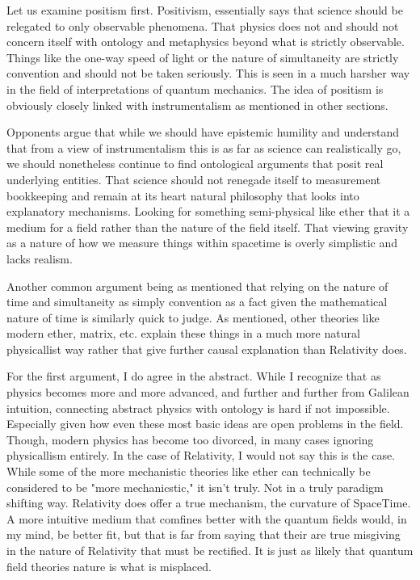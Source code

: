 Let us examine positism first. Positivism, essentially says that science should be relegated to only observable phenomena. That physics does not
and should not concern itself with ontology and metaphysics beyond what is strictly observable. Things like the one-way speed of light or
the nature of simultaneity are strictly convention and should not be taken seriously. This is seen in a much harsher way in the field of interpretations
of quantum mechanics. The idea of positism is obviously closely linked with instrumentalism as mentioned in other sections.

Opponents argue that while we should have epistemic humility and understand that from a view of instrumentalism this is as far as science can realistically
go, we should nonetheless continue to find ontological arguments that posit real underlying entities. That science should not renegade itself to
measurement bookkeeping and remain at its heart natural philosophy that looks into explanatory mechanisms. Looking for something semi-physical like
ether that it a medium for a field rather than the nature of the field itself. That viewing gravity as a nature of how we measure things within
spacetime is overly simplistic and lacks realism.

Another common argument being as mentioned that relying on the nature of time and simultaneity as simply convention as a fact given the mathematical
nature of time is similarly quick to judge. As mentioned, other theories like modern ether, matrix, etc. explain these things in a much more
natural physicallist way rather that give further causal explanation than Relativity does.

For the first argument, I do agree in the abstract. While I recognize that as physics becomes more and more advanced, and further and further from
Galilean intuition, connecting abstract physics with ontology is hard if not impossible. Especially given how even these most basic ideas are
open problems in the field. Though, modern physics has become too divorced, in many cases ignoring physicallism entirely. In the case of Relativity,
I would not say this is the case. While some of the more mechanistic theories like ether can technically be considered to be "more mechanicstic,"
it isn't truly. Not in a truly paradigm shifting way. Relativity does offer a true mechanism, the curvature of SpaceTime. A more intuitive medium
that comfines better with the quantum fields would, in my mind, be better fit, but that is far from saying that their are true misgiving in the nature
of Relativity that must be rectified. It is just as likely that quantum field theories nature is what is misplaced.

